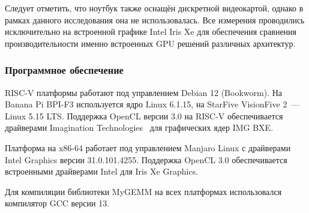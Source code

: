 Следует отметить, что ноутбук также оснащён дискретной видеокартой, однако в рамках данного исследования она не использовалась. Все измерения проводились исключительно на встроенной графике Intel Iris Xe для обеспечения сравнения производительности именно встроенных GPU решений различных архитектур.

\subsubsection{Программное обеспечение}

RISC-V платформы работают под управлением Debian 12 (Bookworm). На Banana Pi BPI-F3 используется ядро Linux 6.1.15, на StarFive VisionFive 2~— Linux 5.15 LTS. Поддержка OpenCL версии 3.0 на RISC-V обеспечивается драйверами Imagination Technologies~\cite{img_opencl} для графических ядер IMG BXE.

Платформа на x86-64 работает под управлением Manjaro Linux с драйверами Intel Graphics версии 31.0.101.4255. Поддержка OpenCL 3.0 обеспечивается встроенными драйверами Intel для Iris Xe Graphics.

Для компиляции библиотеки MyGEMM на всех платформах использовался компилятор GCC версии 13.